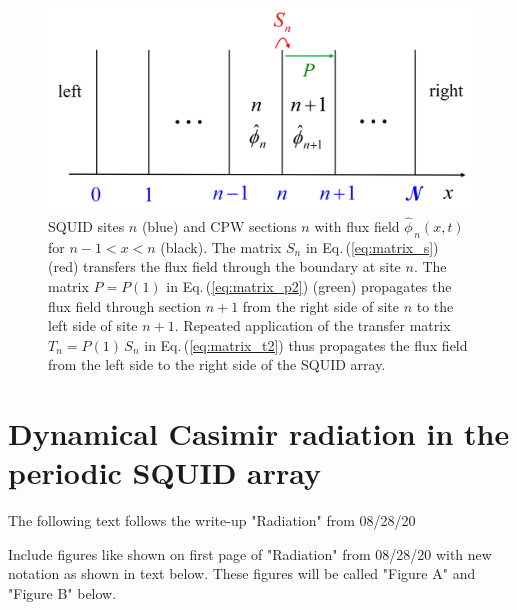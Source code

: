 \begin{figure}
    \includegraphics[width=1.0\textwidth, keepaspectratio]{figures/system/system.png}
    \caption{SQUID sites $n$ (blue) and CPW sections $n$ with flux field $\hat{\phi}_{\,n}(x,t)$ for 
    $n-1 < x < n$ (black). The matrix $S_n$ in Eq.\,(\ref{eq:matrix_s}) (red) transfers the flux field through the 
    boundary at site $n$. The matrix $P = P(1)$ in Eq.\,(\ref{eq:matrix_p2}) (green) propagates the flux field 
    through section $n+1$ from the right side of site $n$ to the left side of site $n+1$. Repeated application 
    of the transfer matrix $T_n = P(1) \, S_n$ in Eq.\,(\ref{eq:matrix_t2}) thus propagates the 
    flux field from the left side to the right side of the SQUID array.}
    \label{fig:system}
\end{figure}




\section{Dynamical Casimir radiation in the periodic SQUID array}
\label{sec:dcr}

\color{red}

\noindent
The following text follows the write-up "Radiation" from 08/28/20

\noindent
Include figures like shown on first page of "Radiation" from 08/28/20 with new notation 
as shown in text below. These figures will be called "Figure A" and "Figure B" below.

\color{black}


